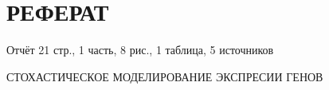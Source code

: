\section*{РЕФЕРАТ}
Отчёт 21 стр., 1 часть, 8 рис., 1 таблица, 5 источников

СТОХАСТИЧЕСКОЕ МОДЕЛИРОВАНИЕ ЭКСПРЕСИИ ГЕНОВ
